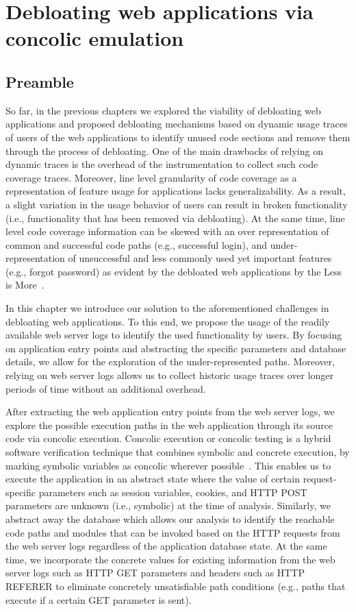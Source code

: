 \chapter{Debloating web applications via concolic emulation}
\label{chap:ad}
\section*{Preamble}

So far, in the previous chapters we explored the viability of debloating web applications and proposed debloating mechanisms based on dynamic usage traces of users of the web applications to identify unused code sections and remove them through the process of debloating. 
One of the main drawbacks of relying on dynamic traces is the overhead of the instrumentation to collect such code coverage traces. 
Moreover, line level granularity of code coverage as a representation of feature usage for applications lacks generalizability. 
As a result, a slight variation in the usage behavior of users can result in broken functionality (i.e., functionality that has been removed via debloating). 
At the same time, line level code coverage information can be skewed with an over representation of common and successful code paths (e.g., successful login), and under-representation of unsuccessful and less commonly used yet important features (e.g., forgot password) as evident by the debloated web applications by the Less is More~\cite{azad2019less}.

In this chapter we introduce our solution to the aforementioned challenges in debloating web applications. 
To this end, we propose the usage of the readily available web server logs to identify the used functionality by users. 
By focusing on application entry points and abstracting the specific parameters and database details, we allow for the exploration of the under-represented paths. 
Moreover, relying on web server logs allows us to collect historic usage traces over longer periods of time without an additional overhead.

After extracting the web application entry points from the web server logs, we explore the possible execution paths in the web application through its source code via concolic execution. 
Concolic execution or concolic testing is a hybrid software verification technique that combines symbolic and concrete execution, by marking symbolic variables as concolic wherever possible~\cite{sen2007concolic}.  
This enables us to execute the application in an abstract state where the value of certain request-specific parameters such as session variables, cookies, and HTTP POST parameters are unknown (i.e., symbolic) at the time of analysis. 
Similarly, we abstract away the database which allows our analysis to identify the reachable code paths and modules that can be invoked based on the HTTP requests from the web server logs regardless of the application database state. 
At the same time, we incorporate the concrete values for existing information from the web server logs such as HTTP GET parameters and headers such as HTTP REFERER to eliminate concretely unsatisfiable path conditions (e.g., paths that execute if a certain GET parameter is sent). 

